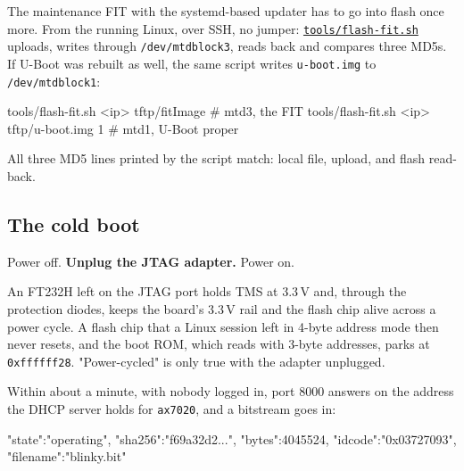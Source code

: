 \documentclass[11pt,a4paper,oneside]{article}
\newcommand{\file}[1]{{\color{bluemid}\nolinkurl{#1}}}
\newcommand{\cmd}[1]{\texttt{#1}}
\newcommand{\repo}{https://github.com/MaxClerkwell/ax7020-bringup}
\newcommand{\rfile}[1]{\href{\repo/blob/master/#1}{\color{bluemid}\nolinkurl{#1}}}
\begin{document}
The maintenance FIT with the systemd-based updater has to go into flash once
more. From the running Linux, over SSH, no jumper: \rfile{tools/flash-fit.sh}
uploads, writes through \file{/dev/mtdblock3}, reads back and compares three
MD5s. If U-Boot was rebuilt as well, the same script writes \file{u-boot.img}
to \file{/dev/mtdblock1}:

\begin{shell}
tools/flash-fit.sh <ip> tftp/fitImage          # mtd3, the FIT
tools/flash-fit.sh <ip> tftp/u-boot.img 1      # mtd1, U-Boot proper
\end{shell}

\begin{checkpoint}
All three MD5 lines printed by the script match: local file, upload, and
flash read-back.
\end{checkpoint}

\subsection{The cold boot}

Power off. \textbf{Unplug the JTAG adapter.} Power on.

\begin{mustknow}
An FT232H left on the JTAG port holds TMS at 3.3\,V and, through the
protection diodes, keeps the board's 3.3\,V rail and the flash chip alive
across a power cycle. A flash chip that a Linux session left in 4-byte
address mode then never resets, and the boot ROM, which reads with 3-byte
addresses, parks at \cmd{0xffffff28}. "Power-cycled" is only true with the
adapter unplugged.
\end{mustknow}

\begin{checkpoint}
Within about a minute, with nobody logged in, port 8000 answers on the
address the DHCP server holds for \cmd{ax7020}, and a bitstream goes in:
\begin{code}
{"state":"operating", "sha256":"f69a32d2...", "bytes":4045524,
 "idcode":"0x03727093", "filename":"blinky.bit"}
\end{code}
\end{checkpoint}
\end{document}
